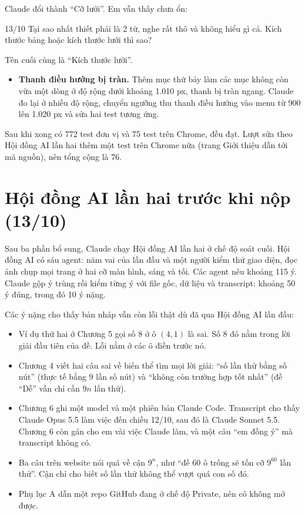 Claude đổi thành ``Cỡ lưới''. Em vẫn thấy chưa ổn:

\begin{promptbox}{13/10}
Tại sao nhất thiết phải là 2 từ, nghe rất thô và không hiểu gì cả. Kích thước bảng hoặc kích thước lưới thì sao?
\end{promptbox}

Tên cuối cùng là ``Kích thước lưới''.

\begin{itemize}
  \item \textbf{Thanh điều hướng bị tràn.} Thêm mục thứ bảy làm các mục không còn vừa một dòng ở độ rộng dưới khoảng 1.010 px, thanh bị tràn ngang. Claude đo lại ở nhiều độ rộng, chuyển ngưỡng thu thanh điều hướng vào menu từ 900 lên 1.020 px và sửa hai test tương ứng.
\end{itemize}

Sau khi xong có 772 test đơn vị và 75 test trên Chrome, đều đạt. Lượt sửa theo Hội đồng AI lần hai thêm một test trên Chrome nữa (trang Giới thiệu dẫn tới mã nguồn), nên tổng cộng là 76.

\section{Hội đồng AI lần hai trước khi nộp (13/10)}
\label{sec:council2}

Sau ba phần bổ sung, Claude chạy Hội đồng AI lần hai ở chế độ soát cuối. Hội đồng AI có sáu agent: năm vai của lần đầu và một người kiểm thử giao diện, đọc ảnh chụp mọi trang ở hai cỡ màn hình, sáng và tối. Các agent nêu khoảng 115 ý. Claude gộp ý trùng rồi kiểm từng ý với file gốc, dữ liệu và transcript: khoảng 50 ý đúng, trong đó 10 ý nặng.

Các ý nặng cho thấy bản nháp vẫn còn lỗi thật dù đã qua Hội đồng AI lần đầu:

\begin{itemize}
  \item Ví dụ thứ hai ở Chương 5 gọi số 8 ở ô \((4, 1)\) là sai. Số 8 đó nằm trong lời giải đầu tiên của đề. Lỗi nằm ở các ô điền trước nó.
  \item Chương 4 viết hai câu sai về biến thể tìm mọi lời giải: ``số lần thử bằng số nút'' (thực tế bằng 9 lần số nút) và ``không còn trường hợp tốt nhất'' (đề ``Dễ'' vẫn chỉ cần \(9n\) lần thử).
  \item Chương 6 ghi một model và một phiên bản Claude Code. Transcript cho thấy Claude Opus 5.5 làm việc đến chiều 12/10, sau đó là Claude Sonnet 5.5. Chương 6 còn gán cho em vài việc Claude làm, và một câu ``em đồng ý'' mà transcript không có.
  \item Ba câu trên website nói quá về cận \(9^n\), như ``đề 60 ô trống sẽ tốn cỡ \(9^{60}\) lần thử''. Cận chỉ cho biết số lần thử không thể vượt quá con số đó.
  \item Phụ lục A dẫn một repo GitHub đang ở chế độ Private, nên cô không mở được.
\end{itemize}

